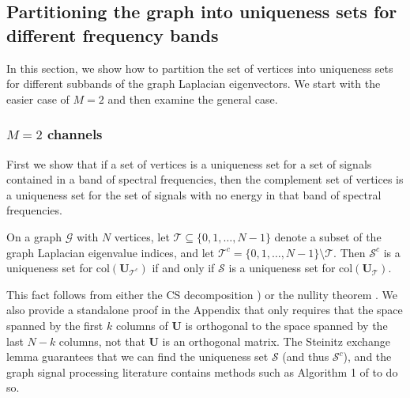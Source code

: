 \documentclass[journal, 10pt]{IEEEtran}
\begin{document}
\subsection{Partitioning the graph into uniqueness sets for different frequency bands}\label{Se:partition}

In this section, we show how to partition the set of vertices into uniqueness sets for different subbands of the graph Laplacian eigenvectors. We start with the easier case of $M=2$ and then examine the general case.

\subsubsection{$M=2$ channels}
First we show that if a set of vertices is a uniqueness set for a set of signals contained in a band of spectral frequencies, then the complement set of vertices is a uniqueness set for the set of signals with no energy in that band of spectral frequencies.
\begin{proposition}\label{Le:highpass_uniqueness}
On a graph ${\mathcal G}$ with $N$ vertices, let 
${\mathcal T} \subseteq \{0,1,\ldots,N-1\}$ denote a subset of the graph Laplacian eigenvalue indices, and let ${\mathcal T}^c=\{0,1,\ldots,N-1\} \setminus {\mathcal T}$.
Then 
$\mathcal{S}^c$ is a uniqueness set for $\mbox{col}({\mathbf{U}}_{{\mathcal T}^c})$
 if and only if
$\mathcal{S}$ is a uniqueness set for 
$\mbox{col}({\mathbf{U}}_{{\mathcal T}})$.
\end{proposition}
This fact follows from either the CS decomposition \cite[Equation (32)]{paige})
or the nullity theorem \cite[Theorem 2.1]{strangInterplay}.  
We also provide a standalone proof %
in the Appendix that only requires that the space spanned by the first $k$ columns of ${\mathbf{U}}$ is orthogonal to the space spanned by the last $N-k$ columns, not that ${\mathbf{U}}$ is an orthogonal matrix.
The Steinitz exchange lemma \cite{steinitz} guarantees that we can find the uniqueness set $\mathcal{S}$ (and thus $\mathcal{S}^c$), and the graph signal processing literature contains methods such as Algorithm 1 of \cite{shomorony} to do so.
\end{document}
